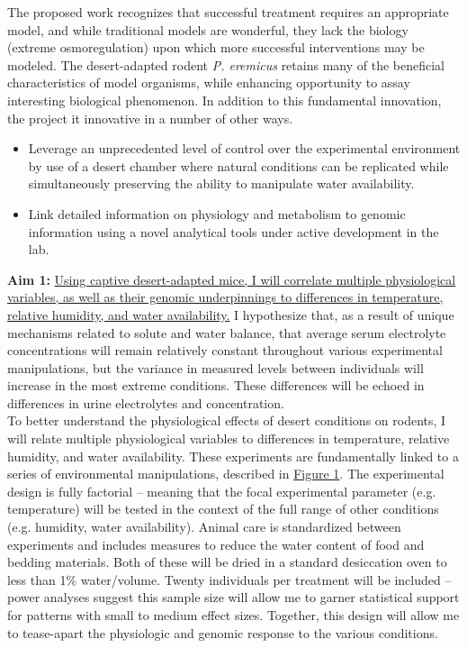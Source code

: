 \documentclass[11pt]{article}
\begin{document}
The proposed work recognizes that successful treatment requires an appropriate model, and while traditional models are wonderful, they lack the biology (extreme osmoregulation) upon which more successful interventions may be modeled. The desert-adapted rodent \textit{P. eremicus} retains many of the beneficial characteristics of model organisms, while enhancing opportunity to assay interesting biological phenomenon. In addition to this fundamental innovation, the project it innovative in a number of other ways.
\begin{itemize}
\item Leverage an unprecedented level of control over the experimental environment by use of a desert chamber where natural conditions can be replicated while simultaneously preserving the ability to manipulate water availability. 
\item Link detailed information on physiology and metabolism to genomic information using a novel analytical tools under active development in the lab.
\end{itemize}

 

\newpage

\linespread{1.2}

\noindent \textbf{Aim 1:} \ul{Using captive desert-adapted mice, I will correlate multiple physiological variables, as well as their genomic underpinnings to differences in temperature, relative humidity, and water availability.} I hypothesize that, as a result of unique mechanisms related to solute and water balance, that average serum electrolyte concentrations will remain relatively constant throughout various experimental manipulations, but the variance in measured levels between individuals will increase in the most extreme conditions. These differences will be echoed in differences in urine electrolytes and concentration. \\

To better understand the physiological effects of desert conditions on rodents, I will relate multiple physiological variables to differences in temperature, relative humidity, and water availability. These experiments are fundamentally linked to a series of environmental manipulations, described in \hyperlink{Figure 1}{Figure 1}. The experimental design is fully factorial -- meaning that the focal experimental parameter (e.g. temperature) will be tested in the context of the full range of other conditions (e.g. humidity, water availability). Animal care is standardized between experiments and includes measures to reduce the water content of food and bedding materials. Both of these will be dried in a standard desiccation oven to less than 1\% water/volume. Twenty individuals per treatment will be included -- power analyses suggest this sample size will allow me to garner statistical support for patterns with small to medium effect sizes. Together, this design will allow me to tease-apart the physiologic and genomic response to the various conditions.  \\
\end{document}
